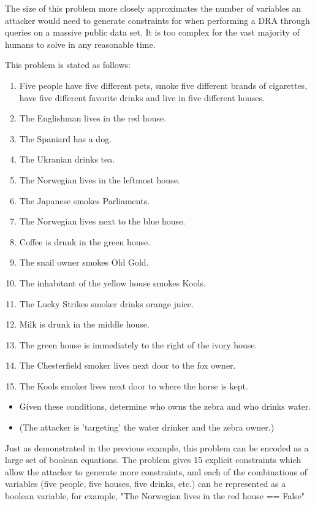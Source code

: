 \documentclass[jou,apacite]{apa6}
\begin{document}
The size of this problem more closely approximates the number
of variables an attacker would need to generate constraints for when performing a DRA through queries on a massive public data set. It is too complex for the vast majority of humans to solve in any reasonable time.

This problem is stated as follows:

\begin{enumerate}
\item Five people have five different pets, smoke five different
       brands of cigarettes, have five different favorite drinks and
       live in five different houses.
\item The Englishman lives in the red house.
\item The Spaniard has a dog.
\item The Ukranian drinks tea.
\item The Norwegian lives in the leftmost house.
\item The Japanese smokes Parliaments.
\item The Norwegian lives next to the blue house.
\item Coffee is drunk in the green house.
\item The snail owner smokes Old Gold.
\item The inhabitant of the yellow house smokes Kools.
\item The Lucky Strikes smoker drinks orange juice.
\item Milk is drunk in the middle house.
\item The green house is immediately to the right of the ivory house.
\item The Chesterfield smoker lives next door to the fox owner.
\item The Kools smoker lives next door to where the horse is kept.
\end{enumerate}


\begin{itemize}
\item Given these conditions, determine who owns the zebra and who drinks water.
\item (The attacker is 'targeting' the water drinker and the zebra owner.)
\end{itemize}

Just as demonstrated in the previous example, this problem
can be encoded as a large set of boolean equations. The problem
gives 15 explicit constraints which allow the attacker to generate more constraints, and each of the combinations of variables (five people, five houses, five drinks, etc.) can be represented as a boolean variable, for example, "The Norwegian lives in the red house == False"
\end{document}
